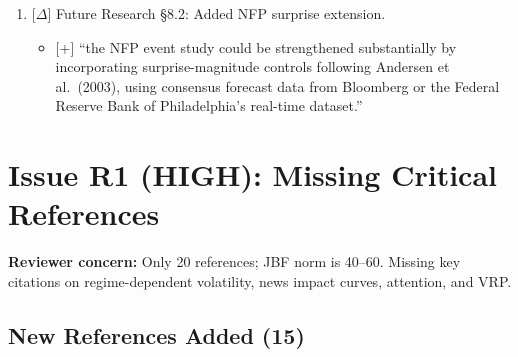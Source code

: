 \documentclass[12pt,a4paper]{article}
\newcommand{\added}[1]{\textcolor{addgreen}{[+] #1}}
\newcommand{\modified}[1]{\textcolor{modblue}{[$\Delta$] #1}}
\begin{document}
\begin{enumerate}[leftmargin=*]
\item \modified{Future Research \S8.2: Added NFP surprise extension.}
\begin{itemize}
\item \added{``the NFP event study could be strengthened substantially by incorporating surprise-magnitude controls following Andersen et al.\ (2003), using consensus forecast data from Bloomberg or the Federal Reserve Bank of Philadelphia's real-time dataset.''}
\end{itemize}

\end{enumerate}

\section*{Issue R1 (HIGH): Missing Critical References}

\textbf{Reviewer concern:} Only 20 references; JBF norm is 40--60. Missing key citations on regime-dependent volatility, news impact curves, attention, and VRP.

\subsection*{New References Added (15)}
\end{document}
